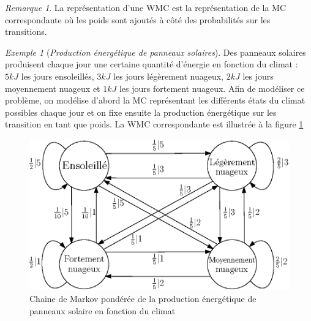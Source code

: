 \documentclass[12pt,a4paper]{report}
\theoremstyle{definition}%
\theoremstyle{remark}
\newtheorem{example}{Exemple}[chapter]
\newtheorem{remark}{Remarque}[chapter]
\begin{document}
\begin{remark}
	La représentation d'une WMC est la représentation de la MC correspondante où les poids sont ajoutés à côté des probabilités sur les transitions.
\end{remark}
\begin{example}[\textit{Production énergétique de panneaux solaires}]
	Des panneaux solaires produisent chaque jour une certaine quantité d'énergie en fonction du climat : $5 kJ$ les jours ensoleillés, $3 kJ$ les jours légèrement nuageux, $2 kJ$ les jours moyennement nuageux et $1 kJ$ les jours fortement nuageux. Afin de modéliser ce problème, on modélise d'abord la MC représentant les différents états du climat possibles chaque jour et on fixe ensuite la production énergétique sur les transition en tant que poids. La WMC correspondante est illustrée à la figure \ref{solar-pannel-1}
	
	\begin{figure}[H]
		\centering
		\includegraphics[scale=0.7]{figures/weather-solar-pannel.eps}
		\caption{Chaine de Markov pondérée de la production énergétique de panneaux solaire en fonction du climat}
		\label{solar-pannel-1}
	\end{figure}
\end{example}
\end{document}
